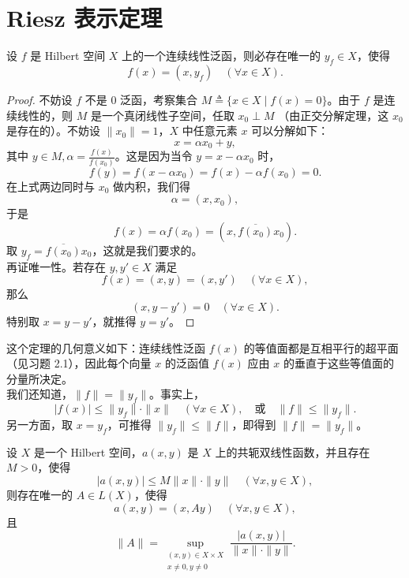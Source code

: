 \documentclass[lang=cn,newtx,10pt,scheme=chinese,thmcnt=chapter]{elegantbook}
\begin{document}
\section{Riesz 表示定理}
\begin{theorem}
	设 $f$ 是 Hilbert 空间 ${X}$ 上的一个连续线性泛函，则必存在唯一的 $y_f \in {X}$，使得
	\[
	f(x) = \left( x, y_f \right) \quad (\forall x \in {X}).
	\]
\end{theorem}
\begin{proof}
 不妨设 $f$ 不是 0 泛函，考察集合 $M \triangleq \{ x \in {X} \mid f(x) = 0 \}$。由于 $f$ 是连续线性的，则 $M$ 是一个真闭线性子空间，任取 $x_0 \perp M$ （由正交分解定理，这 $x_0$ 是存在的）。不妨设 $\|x_0\| = 1$，${X}$ 中任意元素 $x$ 可以分解如下：
\[
x = \alpha x_0 + y,
\]
其中 $y \in M, \alpha = \frac{f(x)}{f(x_0)}$。这是因为当令 $y = x - \alpha x_0$ 时，
\[
f(y) = f(x - \alpha x_0) = f(x) - \alpha f(x_0) = 0.
\]
在上式两边同时与 $x_0$ 做内积，我们得
\[
\alpha = \left( x, x_0 \right),
\]
于是
\[
f(x) = \alpha f(x_0) = \left( x, \overline{f(x_0)} x_0 \right).
\]
取 $y_f = \overline{f(x_0)} x_0$，这就是我们要求的。\\
再证唯一性。若存在 $y, y' \in {X}$ 满足
\[
f(x) = (x, y) = (x, y') \quad (\forall x \in {X}),
\]
那么
\[
(x, y - y') = 0 \quad (\forall x \in {X}).
\]
特别取 $x = y - y'$，就推得 $y = y'$。
\end{proof}
\begin{note} 这个定理的几何意义如下：连续线性泛函 $f(x)$ 的等值面都是互相平行的超平面（见习题 2.1），因此每个向量 $x$ 的泛函值 $f(x)$ 应由 $x$ 的垂直于这些等值面的分量所决定。
\\我们还知道，$\|f\| = \|y_f\|$。事实上，
\[
|f(x)| \leqslant \|y_f\| \cdot \|x\| \quad (\forall x \in {X}), \quad \text{或} \quad \|f\| \leqslant \|y_f\|.
\]
另一方面，取 $x = y_f$，可推得 $\|y_f\| \leqslant \|f\|$，即得到 $\|f\| = \|y_f\|$。
\end{note}
\begin{theorem}
	设 ${X}$ 是一个 Hilbert 空间，$a(x, y)$ 是 ${X}$ 上的共轭双线性函数，并且存在 $M > 0$，使得
	\[
	|a(x, y)| \leqslant M \|x\| \cdot \|y\| \quad (\forall x, y \in {X}),
	\]
	则存在唯一的 $A \in L({X})$，使得
	\[
	a(x, y) = (x, A y) \quad (\forall x, y \in {X}),
	\]
	且
	\[
	\|A\| = \sup_{\substack{(x, y) \in {X} \times {X} \\ x \neq 0, y \neq 0}} \frac{|a(x, y)|}{\|x\| \cdot \|y\|}.
	\]
\end{theorem}
\end{document}
